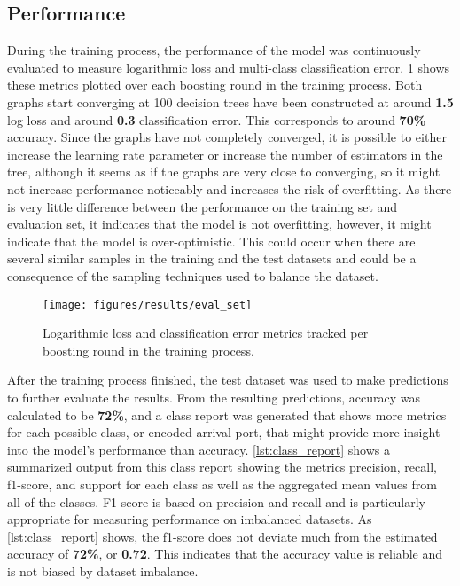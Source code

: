 \subsection{Performance}

During the training process, the performance of the model was continuously evaluated to measure logarithmic loss and multi-class classification error. \cref{fig:eval_set} shows these metrics plotted over each boosting round in the training process. Both graphs start converging at 100 decision trees have been constructed at around \textbf{1.5} log loss and around \textbf{0.3} classification error. This corresponds to around \textbf{70\%} accuracy. Since the graphs have not completely converged, it is possible to either increase the learning rate parameter or increase the number of estimators in the tree, although it seems as if the graphs are very close to converging, so it might not increase performance noticeably and increases the risk of overfitting. As there is very little difference between the performance on the training set and evaluation set, it indicates that the model is not overfitting, however, it might indicate that the model is over-optimistic. This could occur when there are several similar samples in the training and the test datasets and could be a consequence of the sampling techniques used to balance the dataset.

\begin{figure}[htbp]
    \centering
    \texttt{[image: figures/results/eval\_set]}
    \caption{Logarithmic loss and classification error metrics tracked per boosting round in the training process.}
    \label{fig:eval_set}
\end{figure}

After the training process finished, the test dataset was used to make predictions to further evaluate the results. From the resulting predictions, accuracy was calculated to be \textbf{72\%}, and a class report was generated that shows more metrics for each possible class, or encoded arrival port, that might provide more insight into the model's performance than accuracy. \cref{lst:class_report} shows a summarized output from this class report showing the metrics precision, recall, f1-score, and support for each class as well as the aggregated mean values from all of the classes. F1-score is based on precision and recall and is particularly appropriate for measuring performance on imbalanced datasets. As \cref{lst:class_report} shows, the f1-score does not deviate much from the estimated accuracy of \textbf{72\%}, or \textbf{0.72}. This indicates that the accuracy value is reliable and is not biased by dataset imbalance.

